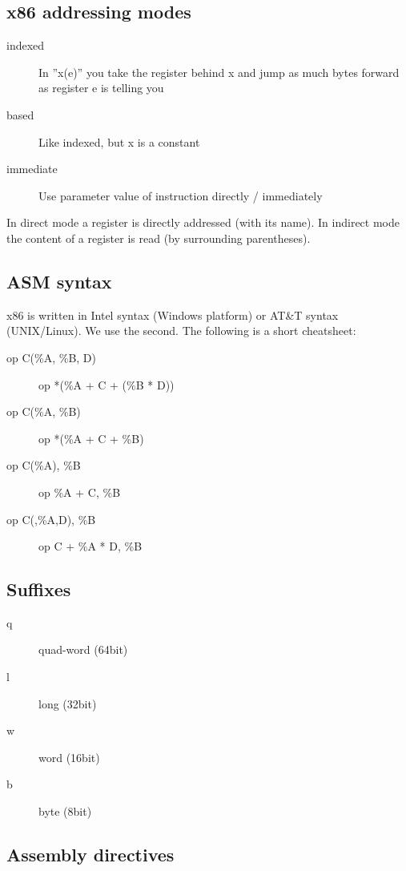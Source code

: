 \documentclass[a4paper,twocolumn]{article}
\begin{document}
\subsection{x86 addressing modes}

\begin{description}
  \item[indexed] In ''x(e)'' you take the register behind x and jump as much
                 bytes forward as register e is telling you
  \item[based] Like indexed, but x is a constant
  \item[immediate] Use parameter value of instruction directly / immediately
\end{description}

In direct mode a register is directly addressed (with its name). In indirect
mode the content of a register is read (by surrounding parentheses).

\subsection{ASM syntax}

x86 is written in Intel syntax (Windows platform) or AT\&T syntax
(UNIX/Linux). We use the second. The following is a short cheatsheet:

\begin{description}
  \item[op C(\%A, \%B, D)]  op *(\%A + C + (\%B * D))
  \item[op C(\%A, \%B)]     op *(\%A + C + \%B)
  \item[op C(\%A), \%B]     op \%A + C, \%B
  \item[op C(,\%A,D), \%B]   op C + \%A * D, \%B
\end{description}

\subsection{Suffixes}

\begin{description}
  \item[q] quad-word  (64bit)
  \item[l] long       (32bit)
  \item[w] word       (16bit)
  \item[b] byte       (8bit)
\end{description}

\subsection{Assembly directives}
\end{document}
